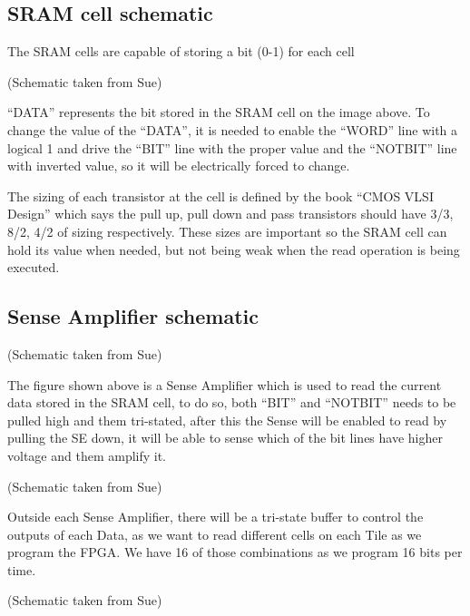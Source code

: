 \documentclass[letterpaper,10pt,english]{sphinxmanual}
\begin{document}
\subsection{SRAM cell schematic}
\label{sramcell:sram-cell-schematic}\label{sramcell::doc}
The SRAM cells are capable of storing a bit (0-1) for each cell

\noindent{}

(Schematic taken from Sue)

“DATA” represents the bit stored in the SRAM cell on the image above. To change the value of the “DATA”, it is needed to enable the ``WORD'' line with a logical 1 and drive the ``BIT'' line with the proper value and the ``NOTBIT'' line with inverted value, so it will be electrically forced to change.

The sizing of each transistor at the cell is defined by the book ``CMOS VLSI Design'' which says the pull up, pull down and pass transistors should have 3/3, 8/2, 4/2 of sizing respectively. These sizes are important so the SRAM cell can hold its value when needed, but not being weak when the read operation is being executed.


\subsection{Sense Amplifier schematic}
\label{senseamp::doc}\label{senseamp:sense-amplifier-schematic}
\noindent{}

(Schematic taken from Sue)

The figure shown above is a Sense Amplifier which is used to read the current data stored in the SRAM cell, to do so, both ``BIT'' and ``NOTBIT'' needs to be pulled high and them tri-stated, after this the Sense will be enabled to read by pulling the SE down, it will be able to sense which of the bit lines have higher voltage and them amplify it.

\noindent{}

(Schematic taken from Sue)

Outside each Sense Amplifier, there will be a tri-state buffer to control the outputs of each Data, as we want to read different cells on each Tile as we program the FPGA. We have 16 of those combinations as we program 16 bits per time.

\noindent{}

(Schematic taken from Sue)
\end{document}
